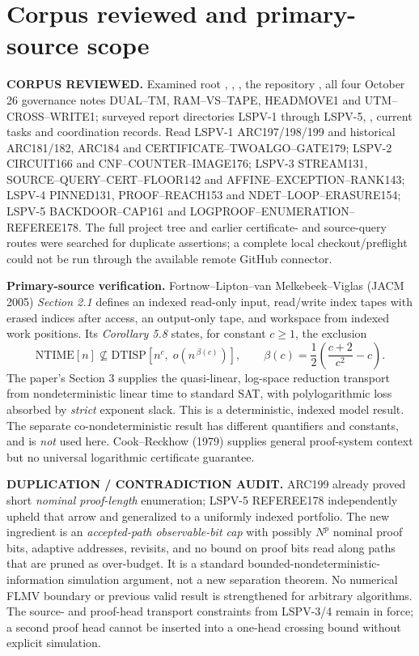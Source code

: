 \documentclass[11pt]{article}
\begin{document}
\section{Corpus reviewed and primary-source scope}
\noindent\textbf{CORPUS REVIEWED.}
Examined root , , ,
the repository ,
all four October 26 governance notes DUAL--TM,
RAM--VS--TAPE, HEADMOVE1 and UTM--CROSS--WRITE1;
surveyed report directories LSPV-1 through LSPV-5,
, current tasks and coordination records.
Read LSPV-1 ARC197/198/199 and historical
ARC181/182, ARC184 and CERTIFICATE--TWOALGO--GATE179;
LSPV-2 CIRCUIT166 and CNF--COUNTER--IMAGE176;
LSPV-3 STREAM131, SOURCE--QUERY--CERT--FLOOR142
and AFFINE--EXCEPTION--RANK143;
LSPV-4 PINNED131, PROOF--REACH153
and NDET--LOOP--ERASURE154;
LSPV-5 BACKDOOR--CAP161 and
LOGPROOF--ENUMERATION--REFEREE178.
The full project tree and earlier certificate- and source-query
routes were searched for duplicate assertions; a complete local
checkout/preflight could not be run through the available remote
GitHub connector.

\noindent\textbf{Primary-source verification.}
Fortnow--Lipton--van Melkebeek--Viglas (JACM 2005)
\emph{Section 2.1} defines an indexed read-only input,
read/write index tapes with erased indices after access,
an output-only tape, and workspace from indexed work
positions. Its \emph{Corollary 5.8} states, for constant
$c\ge1$, the exclusion
\[
\mathrm{NTIME}[n]\not\subseteq
\mathrm{DTISP}\left[n^c,\;
o\!\left(n^{\,\beta(c)}\right)\right],
\qquad
\beta(c)=\frac12\left(\frac{c+2}{c^2}-c\right).
\tag{1}
\]
The paper's Section 3 supplies the quasi-linear,
log-space reduction transport from nondeterministic
linear time to standard SAT, with polylogarithmic
loss absorbed by \emph{strict} exponent slack.
This is a deterministic, indexed model result.
The separate co-nondeterministic result has different
quantifiers and constants, and is \emph{not} used here.
Cook--Reckhow (1979) supplies general proof-system
context but no universal logarithmic certificate guarantee.

\noindent\textbf{DUPLICATION / CONTRADICTION AUDIT.}
ARC199 already proved short \emph{nominal proof-length}
enumeration; LSPV-5 REFEREE178 independently upheld that arrow
and generalized to a uniformly indexed portfolio.
The new ingredient is an \emph{accepted-path observable-bit cap}
with possibly $N^p$ nominal proof bits, adaptive addresses, revisits,
and no bound on proof bits read along paths that are pruned as
over-budget. It is a standard bounded-nondeterministic-information
simulation argument, not a new separation theorem.
No numerical FLMV boundary or previous valid result is strengthened
for arbitrary algorithms.
The source- and proof-head transport constraints from LSPV-3/4
remain in force; a second proof head cannot be inserted into a
one-head crossing bound without explicit simulation.
\end{document}

